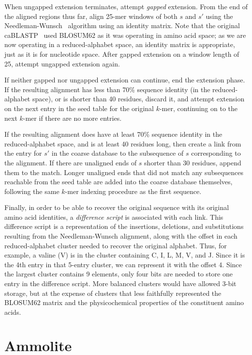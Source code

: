 \documentclass{amsbook}
\theoremstyle{definition}
\theoremstyle{remark}
\numberwithin{equation}{section}
\begin{document}
When ungapped extension terminates, attempt \textit{gapped} extension.
From the end of the aligned regions thus far, align 25-mer windows of both
$s$ and $s'$ using the Needleman-Wunsch~\cite{Needleman:1970gm} algorithm using
an identity matrix.
Note that the original caBLASTP~\cite{Daniels:2013} used BLOSUM62 as it was
operating in amino acid space; as we are now operating in a reduced-alphabet
space, an identity matrix is appropriate, just as it is for nucleotide space.
After gapped extension on a window length of 25, attempt ungapped extension
again.

If neither gapped nor ungapped extension can continue, end the extension phase.
If the resulting alignment has less than 70\% sequence identity (in the 
reduced-alphabet space), or is shorter than 40 residues, discard it, and 
attempt extension on the next entry in the seed table for the original $k$-mer,
continuing on to the next $k$-mer if there are no more entries.

If the resulting alignment does have at least 70\% sequence identity in the
reduced-alphabet space, and is at least 40 residues long, then create a link
from the entry for $s'$ in the coarse database to the subsequence of $s$
corresponding to the alignment.
If there are unaligned ends of $s$ shorter than 30 residues, append them to the
match.
Longer unaligned ends that did not match any subsequences reachable from the
seed table are added into the coarse database themselves, following the same
$k$-mer indexing procedure as the first sequence.

Finally, in order to be able to recover the original sequence with its original
amino acid identities, a \textit{difference script} is associated with each
link.
This difference script is a representation of the insertions, deletions, and
substitutions resulting from the Needleman-Wunsch alignment, along with the
offset in each reduced-alphabet cluster needed to recover the original alphabet.
Thus, for example, a valine (V) is in the cluster containing C, I, L, M, V, and 
J.
Since it is the 4th entry in that 5-entry cluster, we can represent it with
the offset 4.
Since the largest cluster contains 9 elements, only four bits are needed to
store one entry in the difference script.
More balanced clusters would have allowed 3-bit storage, but at the expense of
clusters that less faithfully represented the BLOSUM62 matrix and the
physicochemical properties of the constituent amino acids.

\section{Ammolite}
\end{document}
